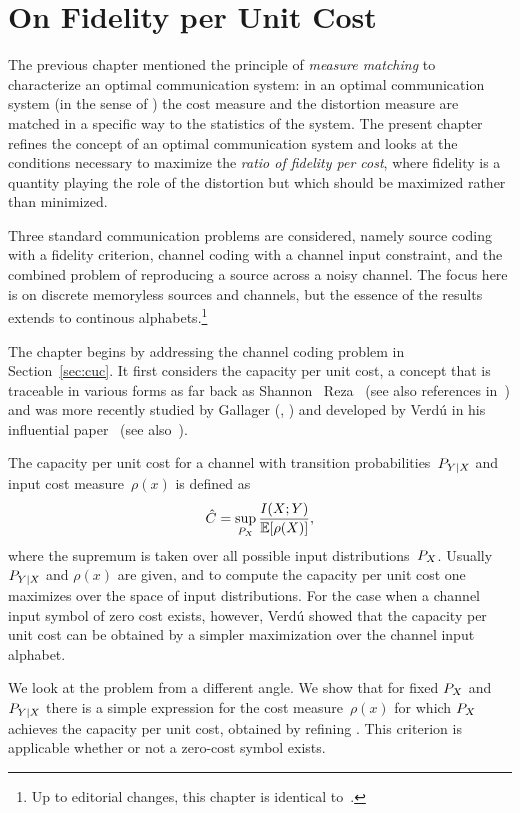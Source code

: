 \chapter{On Fidelity per Unit Cost}\label{ch:fidelity}

The previous chapter mentioned the principle of \emph{measure matching} to
characterize an optimal communication system: in an optimal communication system
(in the sense of ) the cost measure and the distortion
measure are matched in a specific way to the statistics of the system. The
present chapter refines the concept of an optimal communication system and looks
at the conditions necessary to maximize the \emph{ratio of fidelity per cost},
where fidelity is a quantity playing the role of the distortion but which should
be maximized rather than minimized. 

Three standard communication problems are considered, namely source
coding with a fidelity criterion, channel coding  with a channel input
constraint, and the combined problem of reproducing a source across a noisy
channel. The focus here is on discrete memoryless sources and channels, but the
essence of the results extends to continous alphabets.\footnote{Up to editorial
changes, this chapter is identical to~\cite{KleinerR2009a}.}

The chapter begins by addressing the channel coding problem in
Section~\ref{sec:cuc}. It first considers the capacity per unit cost, a concept
that is traceable in various forms as far back as Shannon~\cite{Shannon1948}
Reza~\cite{Reza1961} (see also references in~\cite{Verdu1990}) and was more
recently studied by Gallager (\cite{Gallager1988}, \cite[Ch.~14]{BlahutK2002})
and developed by Verd\'u in his influential paper~\cite{Verdu1990} (see
also~\cite{Verdu2002}).

The capacity per unit cost for a channel with transition probabilities~$P_{Y|X}$
and input cost measure~$\rho(x)$ is defined as \[ {\hat{C}} = \sup_{P_X}
\frac{I(X;Y)}{\mathbb{E}[\rho(X)]}, \] where the supremum is taken over all possible
input distributions~$P_X$.  Usually $P_{Y|X}$ and $\rho(x)$ are given, and to
compute the capacity per unit cost one maximizes over the space of input
distributions. For the case when a channel input symbol of zero cost exists,
however, Verd\'u showed that the capacity per unit cost can be obtained by a
simpler maximization over the channel input alphabet.

We look at the problem from a different angle. We show that for fixed $P_X$ and
$P_{Y|X}$ there is a simple expression for the cost measure~$\rho(x)$ for which
$P_X$ achieves the capacity per unit cost, obtained by refining
. This criterion is applicable whether
or not a zero-cost symbol exists.

